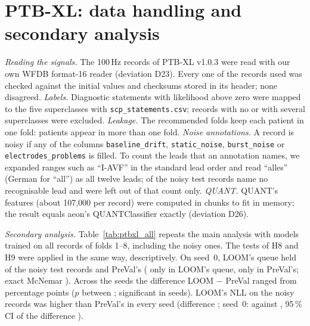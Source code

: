 \documentclass[11pt]{article}
\begin{document}
\section{PTB-XL: data handling and secondary analysis}\label{sec:ptbxl}
\emph{Reading the signals.} The 100\,Hz records of PTB-XL v1.0.3 were read with our own WFDB format-16 reader (deviation D23). Every one of the \PTBN{} records used was checked against the initial values and checksums stored in its header; none disagreed. \emph{Labels.} Diagnostic statements with likelihood above zero were mapped to the five superclasses with \texttt{scp\_statements.csv}; records with no or with several superclasses were excluded. \emph{Leakage.} The recommended folds keep each patient in one fold: \PTBPatientsAcross{} patients appear in more than one fold. \emph{Noise annotations.} A record is noisy if any of the columns \texttt{baseline\_drift}, \texttt{static\_noise}, \texttt{burst\_noise} or \texttt{electrodes\_problems} is filled. To count the leads that an annotation names, we expanded ranges such as ``I-AVF'' in the standard lead order and read ``alles'' (German for ``all'') as all twelve leads; \LeadUnparsed{} of the noisy test records name no recognisable lead and were left out of that count only. \emph{QUANT.} QUANT's features (about 107{,}000 per record) were computed in chunks to fit in memory; the result equals aeon's QUANTClassifier exactly (deviation D26).

\emph{Secondary analysis.} Table~\ref{tab:ptbxl_all} repeats the main analysis with models trained on all records of folds 1--8, including the noisy ones. The tests of H8 and H9 were applied in the same way, descriptively. On seed~0, LOOM's queue held \PTBAllHEightCaughtLoom{} of the \PTBTestNoisy{} noisy test records and PreVal's \PTBAllHEightCaughtPreVal{} (\PTBAllHEightLoomOnly{} only in LOOM's queue, \PTBAllHEightPreValOnly{} only in PreVal's; exact McNemar \PTBAllHEightP). Across the \PTBAllNSeeds{} seeds the difference LOOM $-$ PreVal ranged from \PTBAllHEightDiffRange{} percentage points ($p$ between \PTBAllHEightPRange; significant in \PTBAllHEightSeedsPass{} seeds). LOOM's NLL on the noisy records was higher than PreVal's in every seed (difference \PTBAllHNineDiffRange; seed~0: \PTBAllHNineLoom{} against \PTBAllHNinePreVal, 95\,\% CI of the difference \PTBAllHNineCI).

\begin{table}[h]
\caption{PTB-XL, secondary analysis: training on all \PTBTrainAll{} records of folds 1--8; test folds 9--10. Means over \PTBAllNSeeds{} seeds. Columns as in Table~\ref{M-tab:ptbxl}.}\label{tab:ptbxl_all}
\centering\scriptsize
\end{table}
\end{document}
